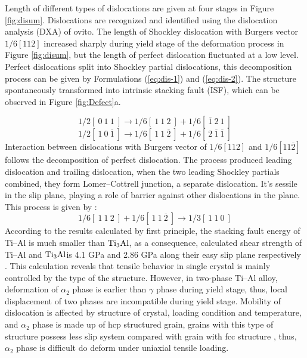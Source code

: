 \documentclass[materials,article,accept,moreauthors,pdftex,10pt,a4paper]{Definitions/mdpi}
\begin{document}
Length of different types of dislocations are given at four stages in Figure \ref{fig:disum}. Dislocations are recognized and identified using the dislocation analysis (DXA) of ovito. The length of Shockley dislocation with Burgers vector $1/6[1 1 2]$ increased sharply during yield stage of the deformation process in Figure \ref{fig:disum}, but the length of perfect dislocation fluctuated at a low level. Perfect  dislocations split into Shockley partial dislocations, this decomposition process  can be given by Formulations (\ref{eq:dis-1}) and (\ref{eq:dis-2}). The structure spontaneously transformed into intrinsic stacking fault (ISF), which can be observed in Figure \ref{fig:Defect}a.




\begin{equation}\label{eq:dis-1}
1/2 [\ 0\ 1\ 1\ ] \to 1/6[\ 1\ 1\ 2\ ]+1/6[\ \overline{1}\ 2\ 1\ ]
\end{equation}
\begin{equation}\label{eq:dis-2}
1/2 [\ 1\ 0\ \overline{1}\ ] \to 1/6 [\ 1\ 1\ \overline{2}\ ] + 1/6[\ 2\ \overline{1}\ \overline{1}\ ]
\end{equation}
Interaction between dislocations with Burgers vector of $1/6 [112] $ and $ 1/6 [11\overline{2}]$ follows the decomposition of perfect dislocation. The process produced leading dislocation and trailing dislocation, when the two leading Shockley partials combined, they form Lomer–Cottrell junction, a separate dislocation. It's sessile in the slip plane, playing a role of barrier against other dislocations in the plane. This process is given by :
\begin{equation}\label{eq:dis-3}
1/6 [\ 1\ 1\ 2\ ] + 1/6 [\ 1\ 1\  \overline{2}\ ] \to 1/3 [\ 1\ 1\ 0\ ]
\end{equation}
According to the  results calculated by first principle, the stacking fault energy of Ti--Al is much smaller than $\rm{Ti_3Al}$, as a consequence, calculated shear strength of Ti--Al and $\rm{Ti_3Al}$is 4.1 GPa and 2.86 GPa along their easy slip plane respectively \cite{Liu2007}. This calculation reveals that tensile behavior in single crystal is mainly controlled by the type of the structure. However, in two-phase Ti--Al alloy, deformation of $\alpha_2$ phase is earlier than $\gamma$ phase during yield stage, thus, local displacement of two phases are incompatible during yield stage.  Mobility of dislocation is affected by structure of crystal, loading condition and temperature, and $\alpha_2$ phase is made up of hcp  structured grain, grains with this type of structure possess less slip system compared with grain with fcc structure \cite{Zhu2012}, thus, $\alpha_2$ phase is difficult do deform under uniaxial tensile loading.
\end{document}
